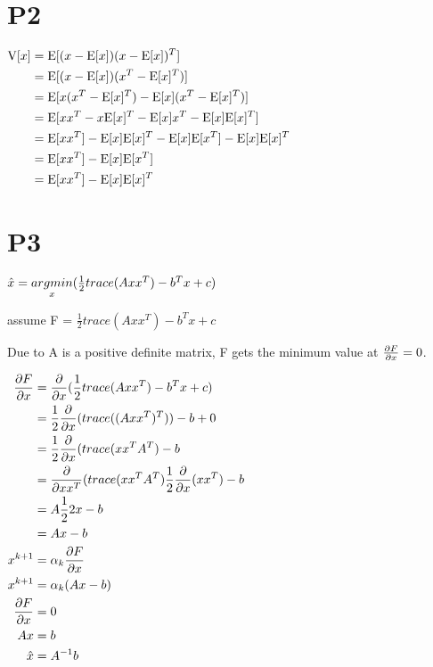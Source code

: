 \documentclass{article}
\begin{document}
\section{P2}

$
\begin{aligned}
\mathrm{V}[x] & = \mathrm{E}[(x-\mathrm{E}[x])(x-\mathrm{E}[x])^T] \\
      & = \mathrm{E}[(x-\mathrm{E}[x])(x^T-\mathrm{E}[x]^T)] \\
      & = \mathrm{E}[x(x^T-\mathrm{E}[x]^T)-\mathrm{E}[x](x^T-\mathrm{E}[x]^T)] \\
      & = \mathrm{E}[xx^T-x\mathrm{E}[x]^T-\mathrm{E}[x]x^T-\mathrm{E}[x]\mathrm{E}[x]^T] \\
      & = \mathrm{E}[xx^T]-\mathrm{E}[x]\mathrm{E}[x]^T-\mathrm{E}[x]\mathrm{E}[x^T]-\mathrm{E}[x]\mathrm{E}[x]^T \\
      & = \mathrm{E}[xx^T]-\mathrm{E}[x]\mathrm{E}[x^T] \\
      & = \mathrm{E}[xx^T]-\mathrm{E}[x]\mathrm{E}[x]^T \\
\end{aligned}
$

\newpage

\section{P3}

$\hat{x} = \mathop{argmin}\limits_{x} (\frac{1}{2} trace(Axx^T) - b^Tx + c)$

assume F = $\frac{1}{2} trace(Axx^T) - b^Tx + c$

Due to A is a positive definite matrix, F gets the minimum value at $\frac{\partial F}{\partial x} = 0$.

$
\begin{aligned}
  \frac{\partial F}{\partial x} & = \frac{\partial }{\partial x}(\frac{1}{2} trace(Axx^T) - b^Tx + c) \\
           & = \frac{1}{2} \frac{\partial }{\partial x}(trace((Axx^T)^T)) - b + 0 \\
           & = \frac{1}{2} \frac{\partial }{\partial x}(trace(xx^TA^T) - b \\
           & = \frac{\partial }{\partial xx^T}(trace(xx^TA^T) \frac{1}{2} \frac{\partial }{\partial x}(xx^T) - b \\
           & = A \frac{1}{2} 2x - b \\
           & = Ax - b \\
  x^{k+1}  & = \alpha_k \frac{\partial F}{\partial x} \\
  x^{k+1}  & = \alpha_k (Ax - b) \\
  \frac{\partial F}{\partial x} & = 0 \\
       Ax  & = b \\
  \hat{x}  & = A^{-1}b
\end{aligned}
$
\end{document}
